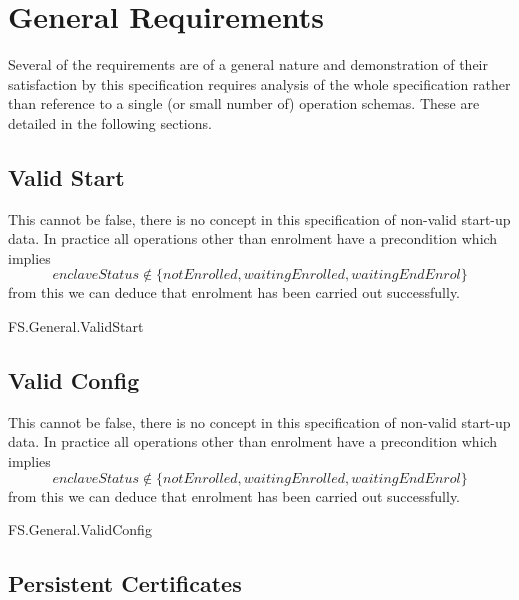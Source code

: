 \section{General Requirements}
Several of the requirements are of a general nature and demonstration
of their satisfaction by this specification requires analysis of the
whole specification rather than reference to a single (or small number
of) operation schemas. These are detailed in the following sections.

\subsection{Valid Start}

This cannot be false, there is no concept in
this specification of non-valid start-up data. In practice all
operations other than enrolment have a precondition which implies
\[
enclaveStatus \notin \{ notEnrolled, waitingEnrolled, waitingEndEnrol
\}
\] 
from this we can deduce that enrolment has been carried out successfully.

\begin{traceunit}{FS.General.ValidStart}
\end{traceunit}%

\subsection{Valid Config}

This cannot be false, there is no concept in
this specification of non-valid start-up data. In practice all
operations other than enrolment have a precondition which implies
\[
enclaveStatus \notin \{ notEnrolled, waitingEnrolled, waitingEndEnrol
\}
\] 
from this we can deduce that enrolment has been carried out successfully.

\begin{traceunit}{FS.General.ValidConfig}
\end{traceunit}%

\subsection{Persistent Certificates}

